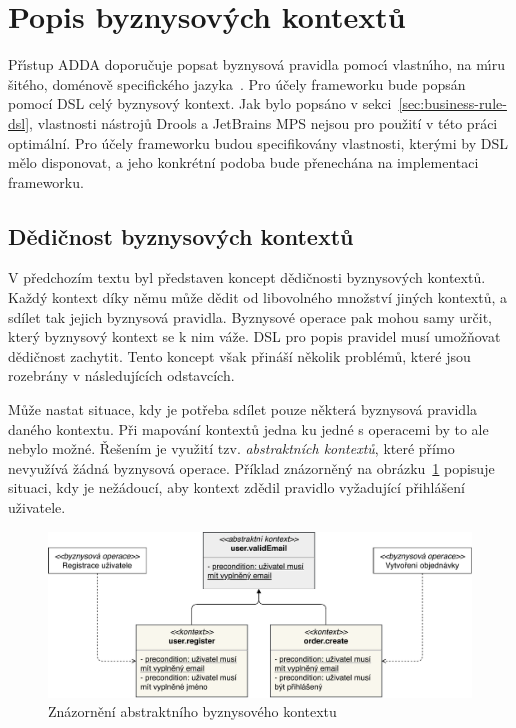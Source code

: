 \section{Popis byznysových kontextů}

Př\'{\i}stup \gls{ADDA} doporučuje popsat byznysová pravidla pomoc\'{\i}
vlastn\'{\i}ho, na m\'{\i}ru šitého, doménově specifického jazyka~\cite{cemus2015automated}.
Pro účely frameworku bude popsán pomocí \gls{DSL} celý byznysový kontext.
Jak bylo popsáno v sekci~\ref{sec:business-rule-dsl}, vlastnosti nástrojů Drools a JetBrains MPS
nejsou pro použití v této práci optimální. Pro účely frameworku budou specifikovány vlastnosti,
kterými by \gls{DSL} mělo disponovat, a jeho konkrétní podoba bude přenechána na implementaci
frameworku.

\subsection{Dědičnost byznysových kontextů}\label{sec:context-inheritance}

V předchozím textu byl představen koncept dědičnosti byznysových kontextů.
Každý kontext díky němu může dědit od libovolného množství jiných kontextů,
a sdílet tak jejich byznysová pravidla. Byznysové operace pak mohou samy určit,
který byznysový kontext se k nim váže. \gls{DSL} pro popis pravidel musí umožňovat
dědičnost zachytit. Tento koncept však přináší několik problémů, které jsou rozebrány
v následujících odstavcích.

Může nastat situace, kdy je potřeba sdílet pouze některá byznysová pravidla
daného kontextu. Při mapování kontextů jedna ku jedné s operacemi by to ale
nebylo možné. Řešením je využití tzv. \textit{abstraktních kontextů},
které přímo nevyužívá žádná byznysová operace. Příklad znázorněný na
obrázku~\ref{fig:abstract-context} popisuje situaci, kdy je nežádoucí,
aby kontext  zdědil pravidlo vyžadující přihlášení uživatele.

\begin{figure}
    \centering
    \includegraphics[keepaspectratio=true, width=1\linewidth]{figures/abstract-context.pdf}
    \caption{Znázornění abstraktního byznysového kontextu}
    \label{fig:abstract-context}
\end{figure}

